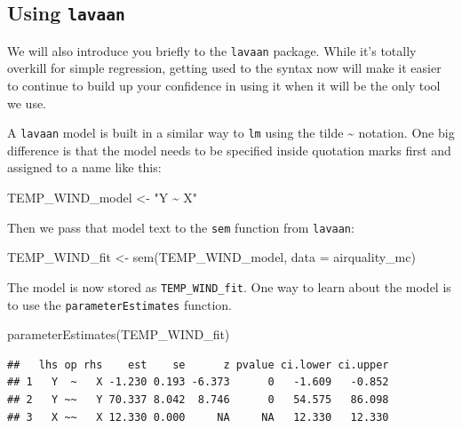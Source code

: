 \documentclass[
]{book}
\newenvironment{Shaded}{\begin{snugshade}}{\end{snugshade}}
\newcommand{\AttributeTok}[1]{\textcolor[rgb]{0.77,0.63,0.00}{#1}}
\newcommand{\FunctionTok}[1]{\textcolor[rgb]{0.00,0.00,0.00}{#1}}
\newcommand{\NormalTok}[1]{#1}
\newcommand{\OtherTok}[1]{\textcolor[rgb]{0.56,0.35,0.01}{#1}}
\newcommand{\StringTok}[1]{\textcolor[rgb]{0.31,0.60,0.02}{#1}}
\begin{document}
\hypertarget{simple-r-lavaan}{%
\subsection{\texorpdfstring{Using \texttt{lavaan}}{Using lavaan}}\label{simple-r-lavaan}}

We will also introduce you briefly to the \texttt{lavaan} package. While it's totally overkill for simple regression, getting used to the syntax now will make it easier to continue to build up your confidence in using it when it will be the only tool we use.

A \texttt{lavaan} model is built in a similar way to \texttt{lm} using the tilde \textasciitilde{} notation. One big difference is that the model needs to be specified inside quotation marks first and assigned to a name like this:

\begin{Shaded}
\begin{Highlighting}[]
\NormalTok{TEMP\_WIND\_model }\OtherTok{\textless{}{-}} \StringTok{"Y \textasciitilde{} X"} 
\end{Highlighting}
\end{Shaded}

Then we pass that model text to the \texttt{sem} function from \texttt{lavaan}:

\begin{Shaded}
\begin{Highlighting}[]
\NormalTok{TEMP\_WIND\_fit }\OtherTok{\textless{}{-}} \FunctionTok{sem}\NormalTok{(TEMP\_WIND\_model, }\AttributeTok{data =}\NormalTok{ airquality\_mc)}
\end{Highlighting}
\end{Shaded}

The model is now stored as \texttt{TEMP\_WIND\_fit}. One way to learn about the model is to use the \texttt{parameterEstimates} function.

\begin{Shaded}
\begin{Highlighting}[]
\FunctionTok{parameterEstimates}\NormalTok{(TEMP\_WIND\_fit)}
\end{Highlighting}
\end{Shaded}

\begin{verbatim}
##   lhs op rhs    est    se      z pvalue ci.lower ci.upper
## 1   Y  ~   X -1.230 0.193 -6.373      0   -1.609   -0.852
## 2   Y ~~   Y 70.337 8.042  8.746      0   54.575   86.098
## 3   X ~~   X 12.330 0.000     NA     NA   12.330   12.330
\end{verbatim}
\end{document}
